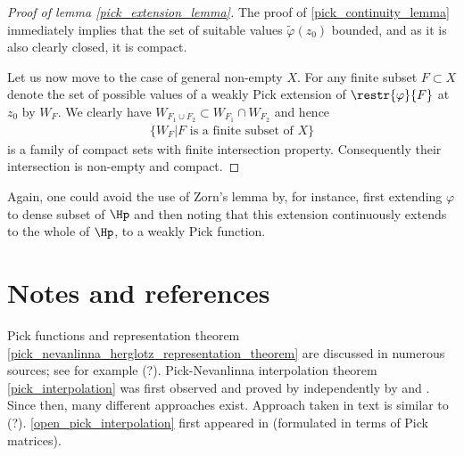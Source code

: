 \begin{proof}[Proof of lemma \ref{pick_extension_lemma}]
	The proof of \ref{pick_continuity_lemma} immediately implies that the set of suitable values $\tilde{\varphi}(z_{0})$ bounded, and as it is also clearly closed, it is compact.

	Let us now move to the case of general non-empty $X$. For any finite subset $F \subset X$ denote the set of possible values of a weakly Pick extension of $\restr{\varphi}{F}$ at $z_{0}$ by $W_{F}$. We clearly have $W_{F_{1} \cup F_{2}} \subset W_{F_{1}} \cap W_{F_{2}}$ and hence
	\begin{align*}
		\{ W_{F} | \text{$F$ is a finite subset of $X$}\}
	\end{align*}
	is a family of compact sets with finite intersection property. Consequently their intersection is non-empty and compact.
\end{proof}

Again, one could avoid the use of Zorn's lemma by, for instance, first extending $\varphi$ to dense subset of $\Hp$ and then noting that this extension continuously extends to the whole of $\Hp$, to a weakly Pick function.

\section{Notes and references}

Pick functions and representation theorem \ref{pick_nevanlinna_herglotz_representation_theorem} are discussed in numerous sources; see for example (?). Pick-Nevanlinna interpolation theorem \ref{pick_interpolation} was first observed and proved by independently by \cite{Pick} and \cite{Nevan}. Since then, many different approaches exist. Approach taken in text is similar to (?). \ref{open_pick_interpolation} first appeared in \cite{Hind} (formulated in terms of Pick matrices).

\begin{comment}

TODO:
\begin{itemize}
	\item Examples of representing measures behind functions and functions behind representing measures
	\item Spectral commutant lifting theorem
	\item Use Morera's theorem to prove weak Hindmarsh's theorem
	\item Nice formula for finite Pick extension (rational function case)
\end{itemize}

\end{comment}






